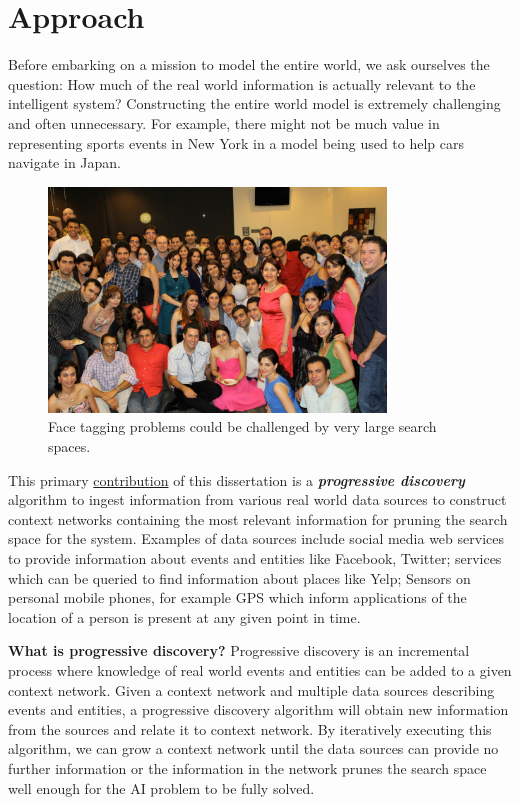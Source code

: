 \section{Approach}
Before embarking on a mission to model the entire world, we ask ourselves the question: How much of the real world information is actually relevant to the intelligent system? Constructing the entire world model is extremely challenging and often unnecessary. For example, there might not be much value in representing sports events in New York in a model being used to help cars navigate in Japan. 

\begin{figure}[t]
\centering
\includegraphics[width=0.8\textwidth]{media/chapter1/setarehetal}
\caption{Face tagging problems could be challenged by very large search spaces.}
\label{fig:people}
\end{figure}

This primary \uline{contribution} of this dissertation is a \textbf{\textit{progressive discovery}} algorithm to ingest information from various real world data sources to construct context networks containing the most relevant information for pruning the search space for the system. Examples of data sources include social media web services to provide information about events and entities like Facebook, Twitter; services which can be queried to find information about places like Yelp; Sensors on personal mobile phones, for example GPS which inform applications of the location of a person is present at any given point in time.

\textbf{What is progressive discovery?} Progressive discovery is an incremental process where knowledge of real world events and entities can be added to a given context network. Given a context network and multiple data sources describing events and entities, a progressive discovery algorithm will obtain new information from the sources and relate it to context network. By iteratively executing this algorithm, we can grow a context network until the data sources can provide no further information or the information in the network prunes the search space well enough for the AI problem to be fully solved.

